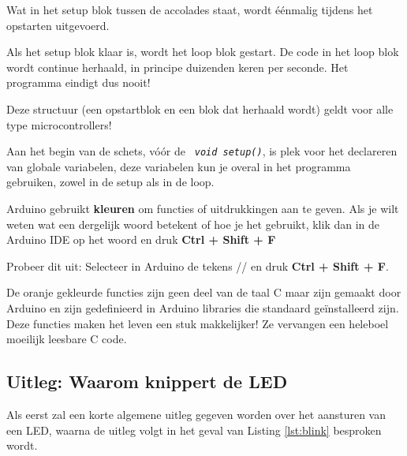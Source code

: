 Wat in het setup blok tussen de accolades {} staat, wordt éénmalig tijdens het opstarten uitgevoerd.

Als het setup blok klaar is, wordt het loop blok gestart. De code in het loop blok wordt continue herhaald, in principe duizenden keren per seconde. Het programma eindigt dus nooit!

Deze structuur (een opstartblok en een blok dat herhaald wordt) geldt voor alle type microcontrollers!

Aan het begin van de schets, vóór de \texttt{\textit{ \textcolor{arduinoBlue}{void} \textcolor{arduinoGreen}{setup}()}}, is plek voor het declareren van globale variabelen, deze variabelen kun je overal in het programma gebruiken, zowel in de setup als in de loop.

\colorbox{blue!15}{
	\begin{minipage}{\textwidth}
		Arduino gebruikt \textbf{kleuren} om \textcolor{BurntOrange}{functies} of \textcolor{BlueGreen}{uitdrukkingen} aan te geven. Als je wilt weten wat een dergelijk woord betekent of hoe je het gebruikt, klik dan in de Arduino IDE op het woord en druk 
		\colorbox{mygray}{\textbf{Ctrl + Shift + F}}
		
		Probeer dit uit: Selecteer in Arduino de tekens // en druk \colorbox{mygray}{\textbf{Ctrl + Shift + F}}.

	\end{minipage}
}

De \textcolor{BurntOrange}{oranje gekleurde functies} zijn geen deel van de taal C maar zijn gemaakt door Arduino en zijn gedefinieerd in Arduino libraries die standaard geïnstalleerd zijn. Deze functies maken het leven een stuk makkelijker! Ze vervangen een heleboel moeilijk leesbare C code.

\subsection{Uitleg: Waarom knippert de LED}

Als eerst zal een korte algemene uitleg gegeven worden over het aansturen van een LED, waarna de uitleg volgt in het geval van Listing \ref{lst:blink} besproken wordt.
